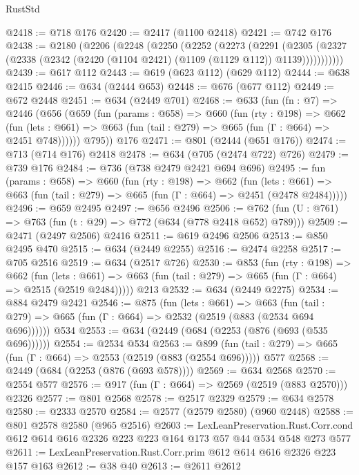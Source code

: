 \begin{lexlean}{RustStd}
\begin{coremodule}
{\begin{coremodule}
{{{{{{{{@2418 := @718 @176
@2420 := @2417 (@1100 @2418)
@2421 := @742 @176
@2438 := @2180
    (@2206
      (@2248
        (@2250
          (@2252
            (@2273
              (@2291
                (@2305
                  (@2327 (@2338 (@2342 (@2420 (@1104 @2421) (@1109 (@1129 @112)) @1139)))))))))))
@2439 := @617 @112
@2443 := @619 (@623 @112) (@629 @112)
@2444 := @638 @2415
@2446 := @634 (@2444 @653)
@2448 := @676 (@677 @112)
@2449 := @672 @2448
@2451 := @634 (@2449 @701)
@2468 := @633
    (fun (fn : @7) =>
    @2446
      (@656
        (@659
          (fun (params : @658) =>
          @660
            (fun (rty : @198) =>
            @662
              (fun (lets : @661) =>
              @663 (fun (tail : @279) => @665 (fun (Γ : @664) => @2451 @748))))))
        @795))
    @176
@2471 := @801 (@2444 (@651 @176))
@2474 := @713 (@714 @176) @2418
@2478 := @634 (@705 (@2474 @722) @726)
@2479 := @739 @176
@2484 := @736 (@738 @2479 @2421 @694 @696)
@2495 := fun (params : @658) =>
  @660
    (fun (rty : @198) =>
    @662
      (fun (lets : @661) =>
      @663 (fun (tail : @279) => @665 (fun (Γ : @664) => @2451 (@2478 @2484)))))
@2496 := @659 @2495
@2497 := @656 @2496
@2506 := @762 (fun (U : @761) => @763 (fun (t : @29) => @772 (@634 (@778 @2418 @652) @789)))
@2509 := @2471 (@2497 @2506) @2416
@2511 := @619 @2496 @2506
@2513 := @850 @2495 @470
@2515 := @634 (@2449 @2255)
@2516 := @2474 @2258
@2517 := @705 @2516
@2519 := @634 (@2517 @726)
@2530 := @853
    (fun (rty : @198) =>
    @662
      (fun (lets : @661) =>
      @663 (fun (tail : @279) => @665 (fun (Γ : @664) => @2515 (@2519 @2484)))))
    @213
@2532 := @634 (@2449 @2275)
@2534 := @884 @2479 @2421
@2546 := @875
    (fun (lets : @661) =>
    @663 (fun (tail : @279) => @665 (fun (Γ : @664) => @2532 (@2519 (@883 (@2534 @694 @696))))))
    @534
@2553 := @634 (@2449 (@684 (@2253 (@876 (@693 (@535 @696))))))
@2554 := @2534 @534
@2563 := @899 (fun (tail : @279) => @665 (fun (Γ : @664) => @2553 (@2519 (@883 (@2554 @696))))) @577
@2568 := @2449 (@684 (@2253 (@876 (@693 @578))))
@2569 := @634 @2568
@2570 := @2554 @577
@2576 := @917 (fun (Γ : @664) => @2569 (@2519 (@883 @2570))) @2326
@2577 := @801 @2568
@2578 := @2517 @2329
@2579 := @634 @2578
@2580 := @2333 @2570
@2584 := @2577 (@2579 @2580) (@960 @2448)
@2588 := @801 @2578 @2580 (@965 @2516)
@2603 := LexLeanPreservation.Rust.Corr.cond
    @612
    @614
    @616
    @2326
    @223
    @223
    @164
    @173
    @57
    @44
    @534
    @548
    @273
    @577
@2611 := LexLeanPreservation.Rust.Corr.prim @612 @614 @616 @2326 @223 @157 @163
@2612 := @38 @40
@2613 := @2611 @2612
}}}}}}}}
\end{coremodule}}
\end{coremodule}
\end{lexlean}
